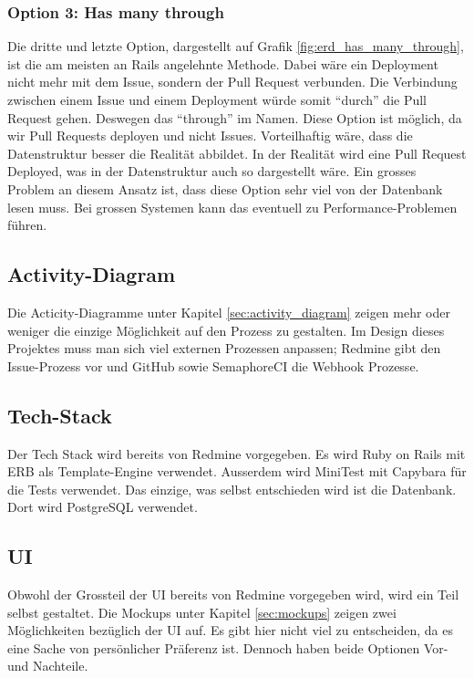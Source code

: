 \subsubsection{Option 3: Has many through}
\label{sec:decide_has_many_through}
Die dritte und letzte Option, dargestellt auf Grafik \ref{fig:erd_has_many_through}, ist die am meisten an Rails angelehnte
Methode. Dabei wäre ein Deployment nicht mehr mit dem Issue, sondern der Pull Request verbunden. Die Verbindung zwischen
einem Issue und einem Deployment würde somit \enquote{durch} die Pull Request gehen. Deswegen das \enquote{through} im Namen.
Diese Option ist möglich, da wir Pull Requests deployen und nicht Issues. \newline
Vorteilhaftig wäre, dass die Datenstruktur besser die Realität abbildet. In der Realität wird eine Pull Request Deployed,
was in der Datenstruktur auch so dargestellt wäre. \newline
Ein grosses Problem an diesem Ansatz ist, dass diese Option sehr viel von der Datenbank lesen muss. Bei grossen Systemen
kann das eventuell zu Performance-Problemen führen.

\subsection{Activity-Diagram}
Die Acticity-Diagramme unter Kapitel \ref{sec:activity_diagram} zeigen mehr oder weniger die einzige Möglichkeit auf den
Prozess zu gestalten. Im Design dieses Projektes muss man sich viel externen Prozessen anpassen; Redmine gibt den
Issue-Prozess vor und GitHub sowie SemaphoreCI die Webhook Prozesse.

\subsection{Tech-Stack}
Der Tech Stack wird bereits von Redmine vorgegeben. Es wird Ruby on Rails mit ERB als Template-Engine verwendet. Ausserdem
wird MiniTest mit Capybara für die Tests verwendet. \newline
Das einzige, was selbst entschieden wird ist die Datenbank. Dort wird PostgreSQL verwendet.

\subsection{UI}
Obwohl der Grossteil der UI bereits von Redmine vorgegeben wird, wird ein Teil selbst gestaltet. Die Mockups unter Kapitel
\ref{sec:mockups} zeigen zwei Möglichkeiten bezüglich der UI auf. \newline
Es gibt hier nicht viel zu entscheiden, da es eine Sache von persönlicher Präferenz ist. Dennoch haben beide Optionen
Vor- und Nachteile. \newline

